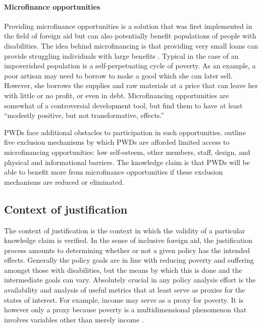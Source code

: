 \documentclass[a4paper]{article}
\begin{document}
\paragraph{Microfinance opportunities}

Providing microfinance opportunities is a solution that was first implemented
in the field of foreign aid but can also potentially benefit populations of
people with disabilities. The idea behind microfinancing is that providing
very small loans can provide struggling individuals with large benefits
\citep{wendt2006building}. Typical in the case of an impoverished population
is a self-perpetuating cycle of poverty. As an example, a poor artisan may
need to borrow to make a good which she can later sell. However, she borrows
the supplies and raw materials at a price that can leave her with little or no
profit, or even in debt. Microfinancing opportunities are somewhat of a
controversial development tool, but \cite{banerjee2015six} find them to have
at least ``modestly positive, but not transformative, effects.''

PWDs face additional obstacles to participation in such opportunities.
\cite{mersland2008access} outline five exclusion mechanisms by which PWDs are
afforded limited access to microfinancing opportunities: low self-esteem,
other members, staff, design, and physical and informational barriers. The
knowledge claim is that PWDs will be able to benefit more from microfinance
opportunities if these exclusion mechanisms are reduced or eliminated.

\subsection{Context of justification}

The context of justification is the context in which the validity of a
particular knowledge claim is verified. In the sense of inclusive foreign aid,
the justification process amounts to determining whether or not a given policy
has the intended effects. Generally the policy goals are in line with reducing
poverty and suffering amongst those with disabilities, but the means by which
this is done and the intermediate goals can vary. Absolutely crucial in any
policy analysis effort is the availability and analysis of useful metrics that
at least serve as proxies for the states of interest. For example, income may
serve as a proxy for poverty. It is however only a proxy because poverty is a
multidimensional phenomenon that involves variables other than merely income
\citep{alkire2011understandings}.
\end{document}

